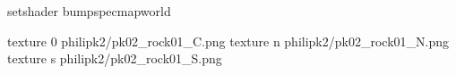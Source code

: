 setshader bumpspecmapworld

texture 0 philipk2/pk02_rock01_C.png
texture n philipk2/pk02_rock01_N.png
texture s philipk2/pk02_rock01_S.png

